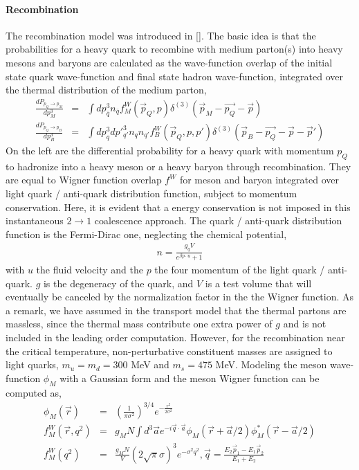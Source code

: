 \paragraph{Recombination}
The recombination model was introduced in []. 
The basic idea is that the probabilities for a heavy quark to recombine with medium parton(s) into heavy mesons and baryons are calculated as the wave-function overlap of the initial state quark wave-function and final state hadron wave-function, integrated over the thermal distribution of the medium parton,
\begin{eqnarray}
\frac{dP_{p_Q \rightarrow p_M}}{dp_M^3} &=& \int dp^3_{\bar{q}} n_{\bar{q}} f^W_{M}(\vec{p}_Q, p)\delta^{(3)}(\vec{p}_M-\vec{p_Q}-\vec{p}) \\
\frac{dP_{p_Q \rightarrow p_B}}{dp_B^3} &=& \int dp^3_{q}dp'^3_{q'} n_{q} n_{q'} f^W_{B}(\vec{p}_Q, p, p')\delta^{(3)}(\vec{p}_B-\vec{p_Q}-\vec{p}-\vec{p}') 
\end{eqnarray}
On the left are the differential probability for a heavy quark with momentum $p_Q$ to hadronize into a heavy meson or a heavy baryon through recombination.
They are equal to Wigner function overlap $f^W$ for meson and baryon integrated over light quark / anti-quark distribution function, subject to momentum conservation.
Here, it is evident that a energy conservation is not imposed in this instantaneous $2\rightarrow 1$ coalescence approach.
The quark / anti-quark distribution function is the Fermi-Dirac one, neglecting the chemical potential, 
\begin{eqnarray}
n = \frac{g_q V}{e^{\beta p\cdot u} + 1}
\end{eqnarray}
with $u$ the fluid velocity and the $p$ the four momentum of the light quark / anti-quark.
$g$ is the degeneracy of the quark, and $V$ is a test volume that will eventually be canceled by the normalization factor in the the Wigner function.
As a remark, we have assumed in the transport model that the thermal partons are massless, since the thermal mass contribute one extra power of $g$ and is not included in the leading order computation.
However, for the recombination near the critical temperature, non-perturbative constituent masses are assigned to light quarks, $m_u = m_d = 300$ MeV and $m_s = 475$ MeV.
Modeling the meson wave-function $\phi_M$ with a Gaussian form and the meson Wigner function can be computed as,
\begin{eqnarray}
\phi_M(\vec{r}) &=& \left(\frac{1}{\pi \sigma^2}\right)^{3/4} e^{-\frac{r^2}{2\sigma^2}}\\
f_M^{W}(\vec{r}, q^2) &=& g_M N \int d^3 \vec{a} e^{-i\vec{q}\cdot \vec{a}} \phi_M(\vec{r}+\vec{a}/2) \phi_M^*(\vec{r}-\vec{a}/2) \\
f_M^{W}(q^2)  &=& \frac{g_M N}{V} (2\sqrt{\pi}\sigma)^3 e^{-\sigma^2 q^2}, \vec{q} = \frac{E_2\vec{p}_1 - E_1\vec{p}_2}{E_1+E_2}
\end{eqnarray} 
